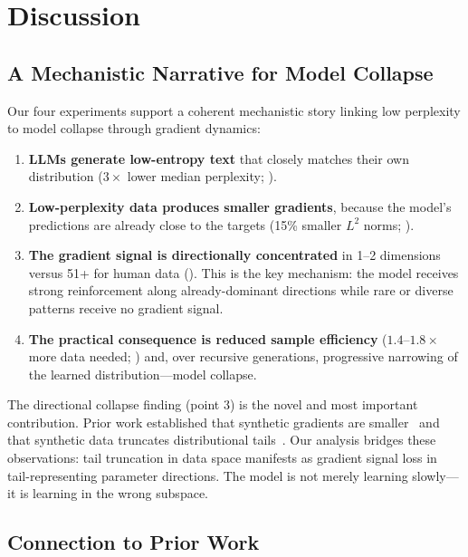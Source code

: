 \section{Discussion}
\label{sec:discussion}

\subsection{A Mechanistic Narrative for Model Collapse}

Our four experiments support a coherent mechanistic story linking low perplexity to model collapse through gradient dynamics:

\begin{enumerate}[leftmargin=*,itemsep=2pt,topsep=2pt]
    \item \textbf{LLMs generate low-entropy text} that closely matches their own distribution ($3\times$ lower median perplexity; ).
    \item \textbf{Low-perplexity data produces smaller gradients}, because the model's predictions are already close to the targets (15\% smaller $L^2$ norms; ).
    \item \textbf{The gradient signal is directionally concentrated} in 1--2 dimensions versus 51+ for human data (). This is the key mechanism: the model receives strong reinforcement along already-dominant directions while rare or diverse patterns receive no gradient signal.
    \item \textbf{The practical consequence is reduced sample efficiency} ($1.4$--$1.8\times$ more data needed; ) and, over recursive generations, progressive narrowing of the learned distribution---\ie model collapse.
\end{enumerate}

The directional collapse finding (point 3) is the novel and most important contribution. Prior work established that synthetic gradients are smaller~\citep{wu2025mitigating} and that synthetic data truncates distributional tails~\citep{dohmatob2024tale}. Our analysis bridges these observations: tail truncation in data space manifests as gradient signal loss in tail-representing parameter directions. The model is not merely learning slowly---it is learning in the wrong subspace.

\subsection{Connection to Prior Work}

